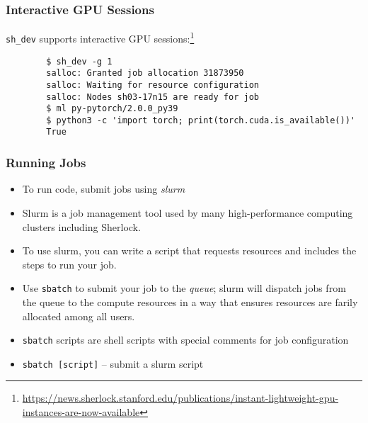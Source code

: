 \documentclass[aspectratio=169]{beamer}
\begin{document}
\begin{frame}[fragile]
	\frametitle{Interactive GPU Sessions}
	\texttt{sh\_dev} supports interactive GPU sessions:\footnote{\url{https://news.sherlock.stanford.edu/publications/instant-lightweight-gpu-instances-are-now-available}}
	\begin{verbatim}
		$ sh_dev -g 1 
		salloc: Granted job allocation 31873950
		salloc: Waiting for resource configuration
		salloc: Nodes sh03-17n15 are ready for job
		$ ml py-pytorch/2.0.0_py39
		$ python3 -c 'import torch; print(torch.cuda.is_available())'
		True
	\end{verbatim}
\end{frame}

\begin{frame}
	\frametitle{Running Jobs}
	\begin{itemize}
		\item To run code, submit jobs using \emph{slurm}
		\item Slurm is a job management tool used by many high-performance computing clusters including Sherlock.
		\item To use slurm, you can write a script that requests resources and includes the steps to run your job.
		\item Use \texttt{sbatch} to submit your job to the \emph{queue}; slurm will dispatch jobs from the queue to the compute resources in a way that ensures resources are farily allocated among all users.
		\item \texttt{sbatch} scripts are shell scripts with special comments for job configuration
		\item \texttt{sbatch [script]} -- submit a slurm script
	\end{itemize}
\end{frame}



\end{document}
